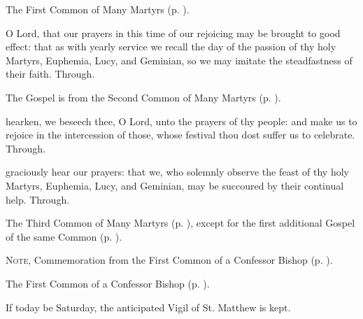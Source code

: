 \begin{rubric}
	The First Common of Many Martyrs (p. \pageref{CommonMartyrsI}).
\end{rubric}

\collect\label{EuphemiaCollect}
 O Lord, that our prayers in this time of our rejoicing may be brought to good effect: that as with yearly service we recall the day of the passion of thy holy Martyrs, Euphemia, Lucy, and Geminian, so we may imitate the steadfastness of their faith. Through.

\begin{rubric}
	The Gospel is from the Second Common of Many Martyrs (p. \pageref{CommonMartyrsIIGospel}).
\end{rubric}

\secret\label{EuphemiaSecret}
 hearken, we beseech thee, O Lord, unto the prayers of thy people: and make us to rejoice in the intercession of those, whose festival thou dost suffer us to celebrate. Through.

\postcommunion\label{EuphemiaPostcommunion}
 graciously hear our prayers: that we, who solemnly observe the feast of thy holy Martyrs, Euphemia, Lucy, and Geminian, may be succoured by their continual help. Through.



\begin{rubric}
	The Third Common of Many Martyrs (p. \pageref{CommonMartyrsIII}), except for the first additional Gospel of the same Common (p. \pageref{Matthew243}).
\end{rubric}
\begin{rubric}
	\textsc{Note,} Commemoration  from the First Common of a Confessor Bishop (p. \pageref{CommonConfessorBishopI}).
\end{rubric}



\begin{rubric}
	The First Common of a Confessor Bishop (p. \pageref{CommonConfessorBishopI}).
\end{rubric}

\begin{rubric}
	If today be Saturday, the anticipated Vigil of St. Matthew is kept.
\end{rubric}


